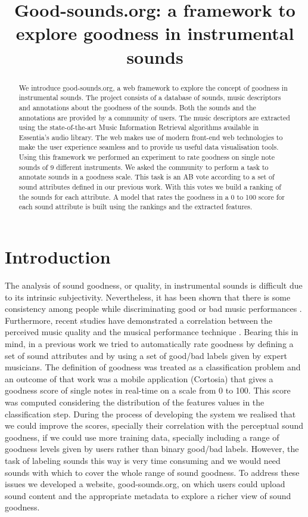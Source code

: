 \documentclass{article}
\title{Good-sounds.org: a framework to explore goodness in instrumental sounds}
\begin{document}
%
\maketitle
%
\begin{abstract}
We introduce good-sounds.org, a web framework to explore the concept of goodness in instrumental sounds. The project consists of a database of sounds, music descriptors and annotations about the goodness of the sounds. Both the sounds and the annotations are provided by a community of users. The music descriptors are extracted using the state-of-the-art Music Information Retrieval algorithms available in Essentia’s audio library. The web makes use of modern front-end web technologies to make the user experience seamless and to provide us useful data visualisation tools. Using this framework we performed an experiment to rate goodness on single note sounds of 9 different instruments. We asked the community to perform a task to annotate sounds in a goodness scale. This task is an AB vote according to a set of sound attributes defined in our previous work. With this votes we build a ranking of the sounds for each attribute. A model that rates the goodness in a 0 to 100 score for each sound attribute is built using the rankings and the extracted features.
\end{abstract}
%
\section{Introduction}\label{sec:introduction}

The analysis of sound goodness, or quality, in instrumental sounds is difficult due to its intrinsic subjectivity. Nevertheless, it has been shown that there is some consistency among people while discriminating good or bad music performances \cite{1}. Furthermore, recent studies have demonstrated a correlation between the perceived music quality and the musical performance technique \cite{2}. Bearing this in mind, in a previous work \cite{01} we tried to automatically rate goodness by defining a set of sound attributes and by using a set of good/bad labels given by  expert musicians. The definition of goodness was treated as a classification problem and an outcome of that work was a mobile application (Cortosia) that gives a goodness score of single notes in real-time on a scale from 0 to 100. This score was computed considering the distribution of the features values in the classification step. During the process of developing the system we realised that we could improve the scores, specially their correlation with the perceptual sound goodness, if we could use more training data, specially including a range of goodness levels given by users rather than binary good/bad labels. However, the task of labeling sounds this way is very time consuming and we would need sounds with which to cover the whole range of sound goodness. To address these issues we developed a website, good-sounds.org, on which users could upload sound content and the appropriate metadata to explore a richer view of sound goodness.     
%
\end{document}
